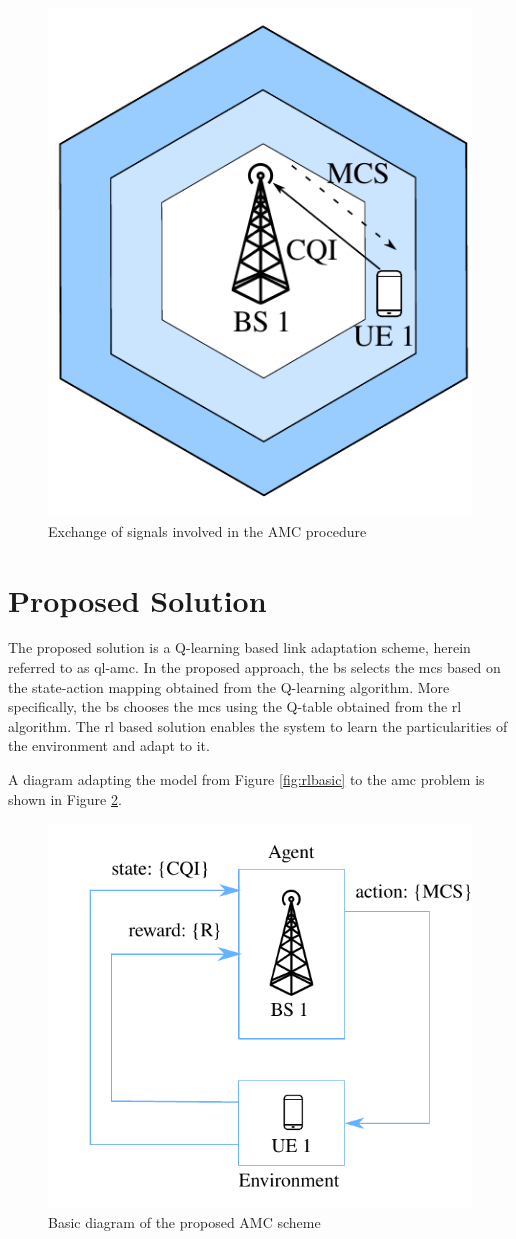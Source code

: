 \begin{figure}[htb]
\centerline{\includegraphics[width=0.4\columnwidth]{figures/chp_amc/system-model-mateus.pdf}}
\caption{Exchange of signals involved in the AMC procedure}
\label{fig:amc-system-model}
\end{figure}






\section{Proposed Solution}

The proposed solution is a Q-learning based link adaptation scheme, herein referred to as \gls{ql-amc}.
%
In the proposed approach, the \gls{bs} selects the \gls{mcs} based on the state-action mapping obtained from the Q-learning algorithm.
%
More specifically, the \gls{bs} chooses the \gls{mcs} using the Q-table obtained from the \gls{rl} algorithm.
%
The \gls{rl} based solution enables the system to learn the particularities of the environment and adapt to it.

A diagram adapting the model from Figure \ref{fig:rlbasic} to the \gls{amc} problem is shown in Figure \ref{fig:amc-rl-frame}.
%
\begin{figure}[htb]
\centerline{\includegraphics[width=0.6\columnwidth]{figures/chp_amc/rl-framework-mateus.pdf}}
\caption{Basic diagram of the proposed AMC scheme}
\label{fig:amc-rl-frame}
\end{figure}
%

